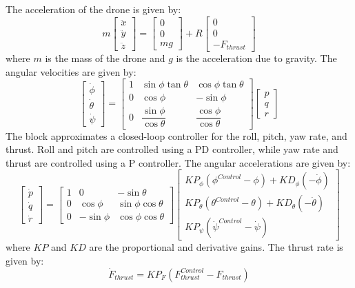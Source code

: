 The acceleration of the drone is given by:
\begin{equation}\label{drone accel}
m
\begin{bmatrix}
\ddot{x}\\
\ddot{y}\\
\ddot{z}
\end{bmatrix}
=
\begin{bmatrix}
0\\
0\\
mg
\end{bmatrix}
+ R
\begin{bmatrix}
0\\
0\\
-F_{thrust}
\end{bmatrix}
\end{equation}
where $m$ is the mass of the drone and $g$ is the acceleration due to gravity. The angular velocities are given by:
\begin{equation}\label{angular velocity}
\begin{bmatrix}
\dot{\phi}\\
\dot{\theta}\\
\dot{\psi}
\end{bmatrix}
=
\begin{bmatrix}
1 & \sin{\phi}\tan{\theta} & \cos{\phi}\tan{\theta}\\
0 & \cos{\phi} & -\sin{\phi}\\
0 & \dfrac{\sin{\phi}}{\cos{\theta}} & \dfrac{\cos{\phi}}{\cos{\theta}}
\end{bmatrix}
\begin{bmatrix}
p\\
q\\
r
\end{bmatrix}
\end{equation}
The block approximates a closed-loop controller for the roll, pitch, yaw rate, and thrust. Roll and pitch are controlled using a PD controller, while yaw rate and thrust are controlled using a P controller. The angular accelerations are given by:
\begin{equation}\label{angular accel}
\begin{bmatrix}
\dot{p}\\
\dot{q}\\
\dot{r}
\end{bmatrix}
=
\begin{bmatrix}
1 & 0 & -\sin{\theta}\\
0 & \cos{\phi} & \sin{\phi}\cos{\theta}\\
0 & -\sin{\phi} & \cos{\phi}\cos{\theta}
\end{bmatrix}
\begin{bmatrix}
KP_\phi(\phi^{Control}-\phi)+KD_\phi(-\dot{\phi})\\
KP_\theta(\theta^{Control}-\theta)+KD_\theta(-\dot{\theta})\\
KP_\psi(\dot{\psi}^{Control}-\dot{\psi})
\end{bmatrix}
\end{equation}
where $KP$ and $KD$ are the proportional and derivative gains. The thrust rate is given by:
\begin{equation}\label{thrust eqn}
\dot{F}_{thrust}=KP_F(F^{Control}_{thrust}-F_{thrust})
\end{equation}
